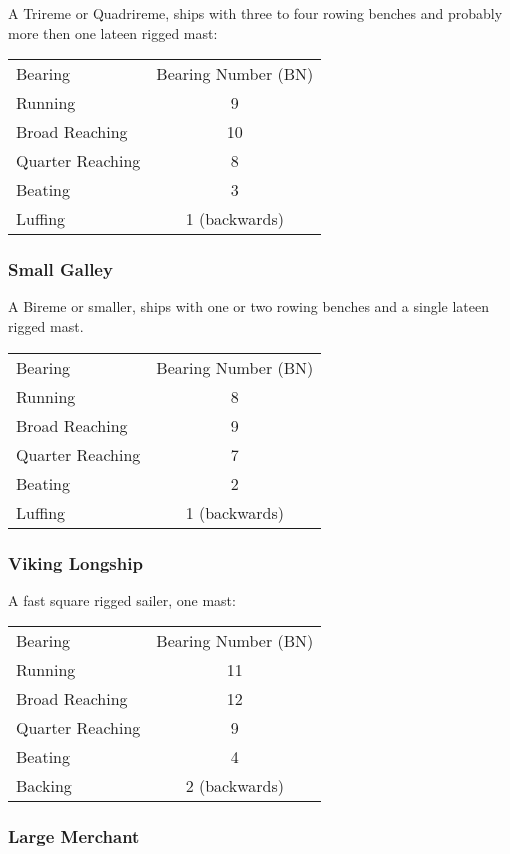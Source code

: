 \documentclass[11pt]{wbzine}
\begin{document}
\begin{multicols}{2}
A Trireme or Quadrireme, ships with three to four rowing benches and
probably more then one lateen rigged mast:

\begin{tabularx}{\columnwidth}{Zc}
Bearing & Bearing Number (BN) \\
Running & 9 \\
Broad Reaching & 10 \\
Quarter Reaching & 8 \\
Beating & 3 \\
Luffing & 1 (backwards) \\
\end{tabularx}

\subsubsection{Small Galley}

A Bireme or smaller, ships with one or two rowing benches and a single
lateen rigged mast.

\begin{tabularx}{\columnwidth}{Zc}
Bearing & Bearing Number (BN) \\
Running & 8 \\
Broad Reaching & 9 \\
Quarter Reaching & 7 \\
Beating & 2 \\
Luffing & 1 (backwards) \\
\end{tabularx}

\subsubsection{Viking Longship}

A fast square rigged sailer, one mast:

\begin{tabularx}{\columnwidth}{Zc}
Bearing & Bearing Number (BN) \\
Running & 11 \\
Broad Reaching & 12 \\
Quarter Reaching & 9 \\
Beating & 4 \\
Backing & 2 (backwards) \\
\end{tabularx}

\subsubsection{Large Merchant}


\end{multicols}
\end{document}
